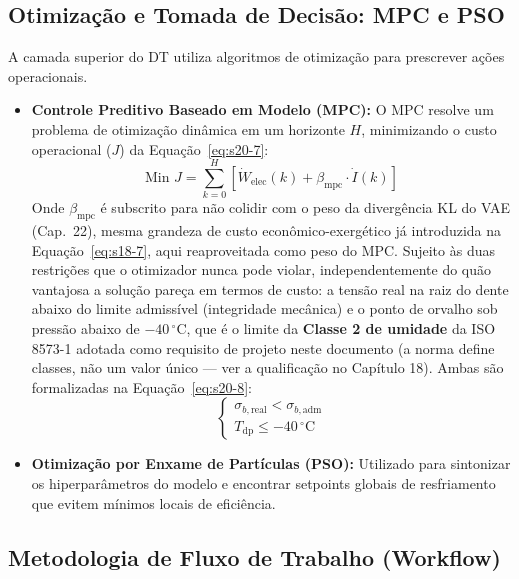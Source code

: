 \documentclass[12pt,a4paper]{article}
\numberwithin{equation}{section}
\numberwithin{table}{section}
\numberwithin{figure}{section}
\begin{document}
{	\subsection{Otimização e Tomada de Decisão: MPC e PSO}
	
	A camada superior do DT utiliza algoritmos de otimização para prescrever ações operacionais.
	
	\begin{itemize}
		\item \textbf{Controle Preditivo Baseado em Modelo (MPC):}
		O MPC resolve um problema de otimização dinâmica em um horizonte $H$, minimizando o custo operacional ($J$) da Equação~\eqref{eq:s20-7}:
		\begin{equation}\label{eq:s20-7}
 \text{Min } J = \sum_{k=0}^{H} \left[ \dot{W}_{\text{elec}}(k) + \beta_{\text{mpc}} \cdotp \dot{I}(k) \right]
\end{equation}
			Onde $\beta_{\text{mpc}}$ é subscrito para não colidir com o peso da divergência KL do VAE (Cap.~22), mesma grandeza de custo econômico-exergético já introduzida na Equação~\eqref{eq:s18-7}, aqui reaproveitada como peso do MPC.
		Sujeito às duas restrições que o otimizador nunca pode violar, independentemente do quão vantajosa a solução pareça em termos de custo: a tensão real na raiz do dente abaixo do limite admissível (integridade mecânica) e o ponto de orvalho sob pressão abaixo de $-40\,^{\circ}$C, que é o limite da \textbf{Classe 2 de umidade} da ISO 8573-1 \cite{iso8573} adotada como requisito de projeto neste documento (a norma define classes, não um valor único — ver a qualificação no Capítulo 18). Ambas são formalizadas na Equação~\eqref{eq:s20-8}:
		\begin{equation}\label{eq:s20-8}
 \begin{cases} \sigma_{b,\text{real}} < \sigma_{b,\text{adm}} \\ T_{\text{dp}} \le -40\,^{\circ}\text{C} \end{cases}
\end{equation}
		
		\item \textbf{Otimização por Enxame de Partículas (PSO):}
		Utilizado para sintonizar os hiperparâmetros do modelo e encontrar setpoints globais de resfriamento que evitem mínimos locais de eficiência.
	\end{itemize}
	
	\subsection{Metodologia de Fluxo de Trabalho (Workflow)}
	
}
\end{document}
